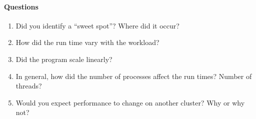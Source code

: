 \pagebreak
\paragraph{Questions}
\begin{enumerate}
\setlength\itemsep{8em}
\item Did you identify a ``sweet spot''? Where did it occur?
\item How did the run time vary with the workload?
\item Did the program scale linearly?
\item In general, how did the number of processes affect the run times? Number of threads?
\item Would you expect performance to change on another cluster? Why or why not?
\end{enumerate}
